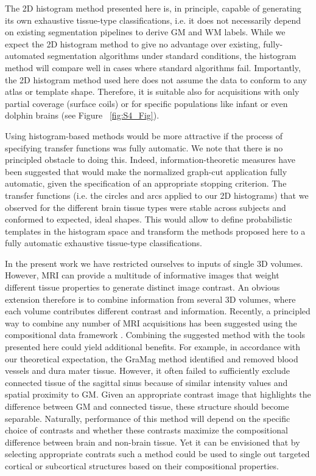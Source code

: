 The 2D histogram method presented here is, in principle, capable of generating its own exhaustive tissue-type classifications, i.e. it does not necessarily depend on existing segmentation pipelines to derive GM and WM labels. While we expect the 2D histogram method to give no advantage over existing, fully-automated segmentation algorithms under standard conditions, the histogram method will compare well in cases where standard algorithms fail. Importantly, the 2D histogram method used here does not assume the data to conform to any atlas or template shape. Therefore, it is suitable also for acquisitions with only partial coverage (surface coils) or for specific populations like infant or even dolphin brains (see Figure ~\ref{fig:S4_Fig}).

Using histogram-based methods would be more attractive if the process of specifying transfer functions was fully automatic. We note that there is no principled obstacle to doing this. Indeed, information-theoretic measures have been suggested \parencite{Ip2012} that would make the normalized graph-cut application fully automatic, given the specification of an appropriate stopping criterion. The transfer functions (i.e. the circles and arcs applied to our 2D histograms) that we observed for the different brain tissue types were stable across subjects and conformed to expected, ideal shapes. This would allow to define probabilistic templates in the histogram space and transform the methods proposed here to a fully automatic exhaustive tissue-type classifications.

In the present work we have restricted ourselves to inputs of single 3D volumes. However, MRI can provide a multitude of informative images that weight different tissue properties to generate distinct image contrast. An obvious extension therefore is to combine information from several 3D volumes, where each volume contributes different contrast and information. Recently, a principled way to combine any number of MRI acquisitions has been suggested using the compositional data framework \parencite{Gulban2018c}. Combining the suggested method with the tools presented here could yield additional benefits. For example, in accordance with our theoretical expectation, the GraMag method identified and removed blood vessels and dura mater tissue. However, it often failed to sufficiently exclude connected tissue of the sagittal sinus because of similar intensity values and spatial proximity to GM. 
Given an appropriate contrast image that highlights the difference between GM and connected tissue, these structure should become separable. Naturally, performance of this method will depend on the specific choice of contrasts and whether these contrasts maximize the compositional difference between brain and non-brain tissue. Yet it can be envisioned that by selecting appropriate contrats such a method could be used to single out targeted cortical or subcortical structures based on their compositional properties.

